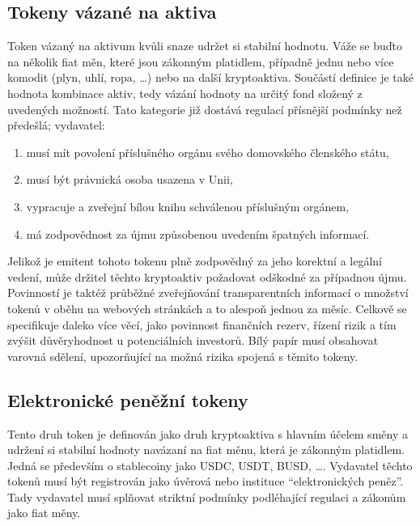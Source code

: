 \subsection{Tokeny vázané na aktiva}
Token vázaný na aktivum kvůli snaze udržet si stabilní hodnotu. Váže se buďto na několik fiat měn, které jsou zákonným platidlem, případně jednu nebo více komodit (plyn, uhlí, ropa, \ldots)
nebo na další kryptoaktiva. Součástí definice je také hodnota kombinace aktiv, tedy vázání hodnoty na určitý fond složený z uvedených možností. Tato kategorie již dostává regulací přísnější
podmínky než předešlá; vydavatel:
\begin{enumerate}
    \item musí mít povolení příslušného orgánu svého domovského členského státu,
    \item musí být právnická osoba usazena v Unii,
    \item vypracuje a zveřejní bílou knihu schválenou příslušným orgánem,
    \item má zodpovědnost za újmu způsobenou uvedením špatných informací.
\end{enumerate}
Jelikož je emitent tohoto tokenu plně zodpovědný za jeho korektní a legální vedení, může držitel těchto kryptoaktiv požadovat odškodné za případnou újmu. Povinností je taktéž
průběžné zveřejňování transparentních informací o množství tokenů v oběhu na webových stránkách a to alespoň jednou za měsíc. Celkově se specifikuje daleko více věcí, jako povinnost
finančních rezerv, řízení rizik a tím zvýšit důvěryhodnost u potenciálních investorů. Bílý papír musí obsahovat varovná sdělení, upozorňující na možná rizika spojená s těmito
tokeny.

\subsection{Elektronické peněžní tokeny}
Tento druh token je definován jako druh kryptoaktiva s hlavním účelem směny a udržení si stabilní hodnoty navázaní na fiat měnu, která je zákonným platidlem. Jedná se především o stablecoiny
jako USDC, USDT, BUSD, \ldots. Vydavatel těchto tokenů musí být registrován jako úvěrová nebo instituce \enquote{elektronických peněz}. Tady vydavatel musí splňovat striktní podmínky
podléhající regulaci a zákonům jako fiat měny.

\endinput